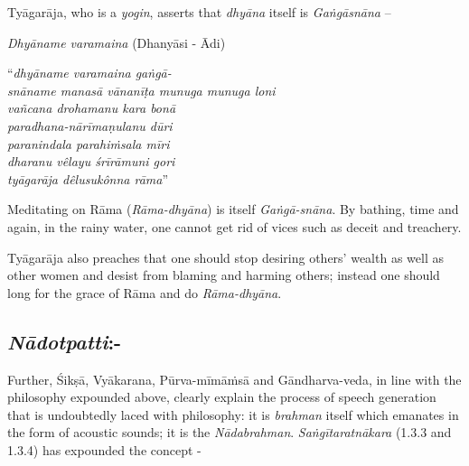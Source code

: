 Tyāgarāja, who is a \textit{yogin}, asserts that \textit{dhyāna} itself is \textit{Gaṅgāsnāna} –

\textit{Dhyāname varamaina} (Dhanyāsi - Ādi)

\begin{centerquote}
“\textit{dhyāname varamaina gaṅgā-}\\ \textit{snāname manasā vānanīṭa munuga munuga loni} \\ \textit{vañcana drohamanu kara bonā}\\ \textit{paradhana-nārīmaṇulanu dūri}\\ \textit{paranindala parahiṁsala mīri}\\ \textit{dharanu vêlayu śrīrāmuni gori}\\ \textit{tyāgarāja dêlusukônna rāma}”
\end{centerquote}

Meditating on Rāma (\textit{Rāma-dhyāna}) is itself \textit{Gaṅgā-snāna}. By bathing, time and again, in the rainy water, one cannot get rid of vices such as deceit and treachery. 

Tyāgarāja also preaches that one should stop desiring others’ wealth as well as other women and desist from blaming and harming others; instead one should long for the grace of Rāma and do \textit{Rāma-dhyāna}.

\vspace{-.4cm}

\subsection*{\textit{Nādotpatti}:-}

\vspace{-.23cm}

Further, Śikṣā, Vyākarana, Pūrva-mīmāṁsā and Gāndharva-veda,\textit{} in line with the philosophy expounded above, clearly explain the process of speech generation that is undoubtedly laced with philosophy: it is \textit{brahman} itself which emanates in the form of acoustic sounds; it is the \textit{Nādabrahman}. \textit{Saṅgītaratnākara} (1.3.3 and 1.3.4) has expounded the concept -

\vspace{-.2cm}

